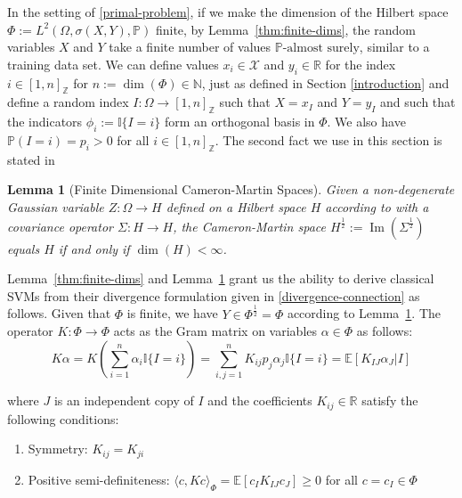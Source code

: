 \documentclass{article}
\newtheorem{lemma}{Lemma}
\begin{document}
In the setting of \ref{primal-problem}, if we make the dimension of the Hilbert space $\Phi := L^2(\Omega, \sigma(X,Y), \mathbb{P})$ finite, by Lemma~\ref{thm:finite-dims}, the random variables $X$ and $Y$ take a finite number of values $\mathbb{P}\text{-almost surely}$, similar to a training data set. We can define values $x_i \in \mathcal{X}$ and $y_i \in \mathbb{R}$ for the index $i \in [1,n]_\mathbb{Z}$ for $n := \dim(\Phi) \in \mathbb{N}$, just as defined in Section \ref{introduction} and define a random index $I : \Omega \rightarrow [1,n]_\mathbb{Z}$ such that $X = x_I$ and $Y = y_I$ and such that the indicators $\phi_i := \mathbb{I}\{I = i\}$ form an orthogonal basis in $\Phi$. We also have $\mathbb{P}(I=i) = p_i > 0$ for all $i \in [1,n]_\mathbb{Z}$. The second fact we use in this section is stated in \cite[Section 2.2]{Bardelli_Eleonora_2017_Journal_of_Geometric_Mechanics}

\begin{lemma}[Finite Dimensional Cameron-Martin Spaces]\label{thm:finite-cam-martin}
Given a non-degenerate Gaussian variable $Z : \Omega \rightarrow H$ defined on a Hilbert space $H$ according to \cite[Section 2.3.2]{Da_Prato_Zabczyk_1992} with a covariance operator $\Sigma : H \rightarrow H$, the Cameron-Martin space $H^{\frac{1}{2}} := \operatorname{Im}(\Sigma^{\frac{1}{2}})$ equals $H$ if and only if $\dim(H) < \infty$.
\end{lemma}

Lemma~\ref{thm:finite-dims} and Lemma~\ref{thm:finite-cam-martin} grant us the ability to derive classical SVMs from their divergence formulation given in \ref{divergence-connection} as follows. Given that $\Phi$ is finite, we have $Y \in \Phi^{\frac{1}{2}} = \Phi$ according to Lemma~\ref{thm:finite-cam-martin}. The operator $K : \Phi \rightarrow \Phi$ acts as the Gram matrix on variables $\alpha \in \Phi$ as follows:
\begin{equation}
K \alpha = K \left(\sum_{i=1}^n \alpha_i \mathbb{I}\{I=i\}\right) = \sum_{i,j=1}^n K_{ij}p_j\alpha_j \mathbb{I}\{I=i\} =  \mathbb{E}[K_{IJ}\alpha_J|I]
\end{equation}

where $J$ is an independent copy of $I$ and the coefficients $K_{ij} \in \mathbb{R}$ satisfy the following conditions:
\begin{enumerate}
    \item Symmetry: $K_{ij} = K_{ji}$
    \item Positive semi-definiteness: $\langle c, Kc \rangle_\Phi = \mathbb{E}[c_I K_{IJ} c_J] \ge 0$ for all $c = c_I\in \Phi$
\end{enumerate}
\end{document}
